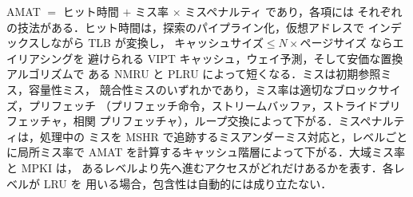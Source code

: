 \documentclass[../main.tex]{subfiles}
\begin{document}
\begin{keypoint}[章のまとめ]
  AMAT $=$ ヒット時間 $+$ ミス率 $\times$ ミスペナルティ であり，各項には
  それぞれの技法がある．ヒット時間は，探索のパイプライン化，仮想アドレスで
  インデックスしながら TLB が変換し，
  $\text{キャッシュサイズ} \le N \times \text{ページサイズ}$ ならエイリアシングを
  避けられる VIPT キャッシュ，ウェイ予測，そして安価な置換アルゴリズムで
  ある NMRU と PLRU によって短くなる．ミスは初期参照ミス，容量性ミス，
  競合性ミスのいずれかであり，ミス率は適切なブロックサイズ，プリフェッチ
  （プリフェッチ命令，ストリームバッファ，ストライドプリフェッチャ，相関
  プリフェッチャ），ループ交換によって下がる．ミスペナルティは，処理中の
  ミスを MSHR で追跡するミスアンダーミス対応と，レベルごとに局所ミス率で
  AMAT を計算するキャッシュ階層によって下がる．大域ミス率と MPKI は，
  あるレベルより先へ進むアクセスがどれだけあるかを表す．各レベルが LRU を
  用いる場合，包含性は自動的には成り立たない．
\end{keypoint}
\end{document}
